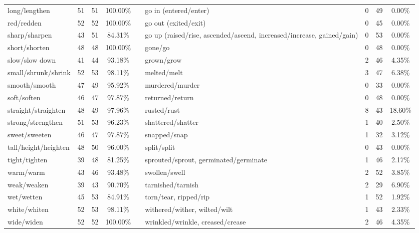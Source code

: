 \begin{tabular}{p{3cm}ccccp{3cm}ccc}
long/lengthen & 51 & 51 & 100.00\% & & go in (entered/enter) & 0 & 49 & 0.00\% \\
red/redden & 52 & 52 & 100.00\% & & go out (exited/exit) & 0 & 45 & 0.00\% \\
sharp/sharpen & 43 & 51 & 84.31\% & & go up (raised/rise, ascended/ascend, increased/increase, gained/gain) & 0 & 53 & 0.00\% \\
short/shorten & 48 & 48 & 100.00\% & & gone/go & 0 & 48 & 0.00\% \\
slow/slow down & 41 & 44 & 93.18\% & & grown/grow & 2 & 46 & 4.35\% \\
small/shrunk/shrink & 52 & 53 & 98.11\% & & melted/melt & 3 & 47 & 6.38\% \\
smooth/smooth & 47 & 49 & 95.92\% & & murdered/murder & 0 & 33 & 0.00\% \\
soft/soften & 46 & 47 & 97.87\% & & returned/return & 0 & 48 & 0.00\% \\
straight/straighten & 48 & 49 & 97.96\% & & rusted/rust & 8 & 43 & 18.60\% \\
strong/strengthen & 51 & 53 & 96.23\% & & shattered/shatter & 1 & 40 & 2.50\% \\
sweet/sweeten & 46 & 47 & 97.87\% & & snapped/snap & 1 & 32 & 3.12\% \\
tall/height/heighten & 48 & 50 & 96.00\% & & split/split & 0 & 43 & 0.00\% \\
tight/tighten & 39 & 48 & 81.25\% & & sprouted/sprout, germinated/germinate & 1 & 46 & 2.17\% \\
warm/warm & 43 & 46 & 93.48\% & & swollen/swell & 2 & 52 & 3.85\% \\
weak/weaken & 39 & 43 & 90.70\% & & tarnished/tarnish & 2 & 29 & 6.90\% \\
wet/wetten & 45 & 53 & 84.91\% & & torn/tear, ripped/rip & 1 & 52 & 1.92\% \\
white/whiten & 52 & 53 & 98.11\% & & withered/wither, wilted/wilt & 1 & 43 & 2.33\% \\
wide/widen & 52 & 52 & 100.00\% & & wrinkled/wrinkle, creased/crease & 2 & 46 & 4.35\%
\end{tabular}